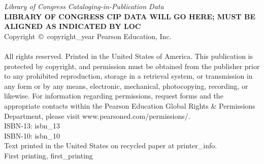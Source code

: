 {\noindent\textit{Library of Congress Cataloging-in-Publication Data}\\[.75ex]  %
\textbf{LIBRARY OF CONGRESS CIP DATA WILL GO HERE; MUST BE ALIGNED AS INDICATED BY LOC}\\[.75ex]
\noindent Copyright~\copyright~{{copyright_year}} Pearson Education, Inc.\\
\hspace{\fill}\\
\noindent All rights reserved. Printed in the United States of America. This publication is protected by copyright, and permission must be obtained from the publisher prior to any prohibited reproduction, storage in a retrieval system, or transmission in any form or by any means, electronic, mechanical, photocopying, recording, or likewise. For information regarding permissions, request forms and the appropriate contacts within the Pearson Education Global Rights \& Permissions Department, please visit www.pearsoned.com/permissions/.\\[.75ex]

\noindent ISBN-13: {{isbn_13}}\\[-.5ex] %
\noindent ISBN-10: {{isbn_10}} \\[-.5ex] %
\noindent Text printed in the United States on recycled paper at {{printer_info}}.\\[-.5ex] %
\noindent First printing, {{first_printing}} %
}
